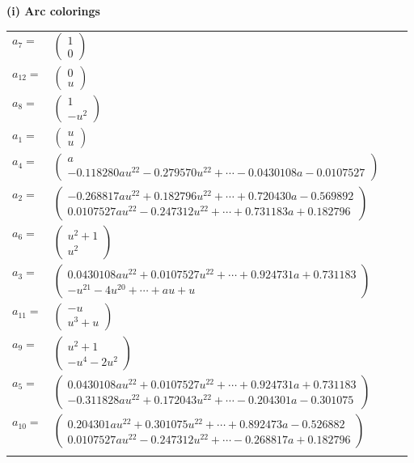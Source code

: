 \documentclass[1p]{elsarticle_modified}
\theoremstyle{definition}
\begin{document}
\flushleft \textbf{(i) Arc colorings}\\
\begin{tabular}{m{7pt} m{180pt} m{7pt} m{180pt} }
\flushright $a_{7}=$&$\begin{pmatrix}1\\0\end{pmatrix}$ \\
\flushright $a_{12}=$&$\begin{pmatrix}0\\u\end{pmatrix}$ \\
\flushright $a_{8}=$&$\begin{pmatrix}1\\- u^2\end{pmatrix}$ \\
\flushright $a_{1}=$&$\begin{pmatrix}u\\u\end{pmatrix}$ \\
\flushright $a_{4}=$&$\begin{pmatrix}a\\-0.118280 a u^{22}-0.279570 u^{22}+\cdots-0.0430108 a-0.0107527\end{pmatrix}$ \\
\flushright $a_{2}=$&$\begin{pmatrix}-0.268817 a u^{22}+0.182796 u^{22}+\cdots+0.720430 a-0.569892\\0.0107527 a u^{22}-0.247312 u^{22}+\cdots+0.731183 a+0.182796\end{pmatrix}$ \\
\flushright $a_{6}=$&$\begin{pmatrix}u^2+1\\u^2\end{pmatrix}$ \\
\flushright $a_{3}=$&$\begin{pmatrix}0.0430108 a u^{22}+0.0107527 u^{22}+\cdots+0.924731 a+0.731183\\- u^{21}-4 u^{20}+\cdots+a u+u\end{pmatrix}$ \\
\flushright $a_{11}=$&$\begin{pmatrix}- u\\u^3+u\end{pmatrix}$ \\
\flushright $a_{9}=$&$\begin{pmatrix}u^2+1\\- u^4-2 u^2\end{pmatrix}$ \\
\flushright $a_{5}=$&$\begin{pmatrix}0.0430108 a u^{22}+0.0107527 u^{22}+\cdots+0.924731 a+0.731183\\-0.311828 a u^{22}+0.172043 u^{22}+\cdots-0.204301 a-0.301075\end{pmatrix}$ \\
\flushright $a_{10}=$&$\begin{pmatrix}0.204301 a u^{22}+0.301075 u^{22}+\cdots+0.892473 a-0.526882\\0.0107527 a u^{22}-0.247312 u^{22}+\cdots-0.268817 a+0.182796\end{pmatrix}$\\&\end{tabular}
\end{document}
